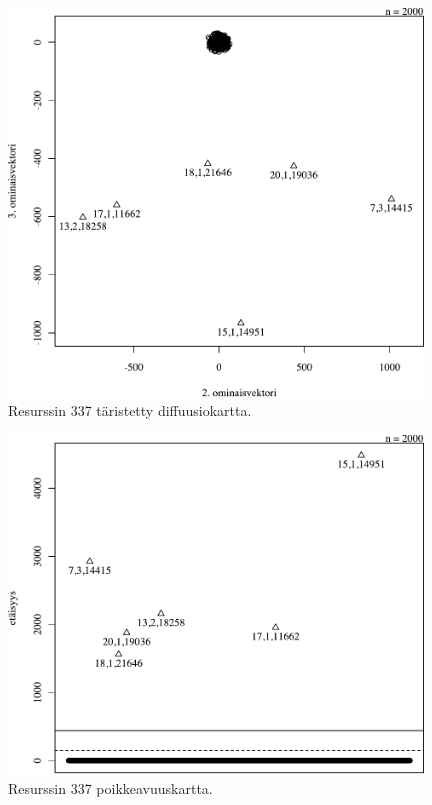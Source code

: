 \begin{figure}[p]
\centering
\includegraphics[width=11cm]{pics/diffuusiokuvat/service_337.pdf}
\caption{Resurssin 337 täristetty diffuusiokartta.}
\label{diffusio_337}
\end{figure}

\begin{figure}[p]
\centering
\includegraphics[width=11cm]{pics/tiheyskuvat/service_337.pdf}
\caption{Resurssin 337 poikkeavuuskartta.}
\label{service_337}
\end{figure}

